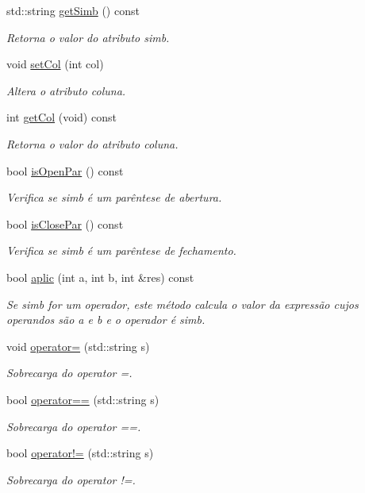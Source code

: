\begin{DoxyCompactItemize}
std\-::string \hyperlink{class_simbolo_ad2e86fd9678cc05b495938e27ef04b50}{get\-Simb} () const 
\begin{DoxyCompactList}\small\item\em Retorna o valor do atributo simb. \end{DoxyCompactList}\item 
void \hyperlink{class_simbolo_a9717bf2cea703db82e87c10a58655171}{set\-Col} (int col)
\begin{DoxyCompactList}\small\item\em Altera o atributo coluna. \end{DoxyCompactList}\item 
int \hyperlink{class_simbolo_a703e96438e392151f46cbdc8ac44c741}{get\-Col} (void) const 
\begin{DoxyCompactList}\small\item\em Retorna o valor do atributo coluna. \end{DoxyCompactList}\item 
bool \hyperlink{class_simbolo_a01b430f8460d586518d0c76cf2d07d5a}{is\-Open\-Par} () const 
\begin{DoxyCompactList}\small\item\em Verifica se simb é um parêntese de abertura. \end{DoxyCompactList}\item 
bool \hyperlink{class_simbolo_a9d76ad26a52668275249753e423c3b0f}{is\-Close\-Par} () const 
\begin{DoxyCompactList}\small\item\em Verifica se simb é um parêntese de fechamento. \end{DoxyCompactList}\item 
bool \hyperlink{class_simbolo_ad79485717cf10a7b91d88bb8601033e3}{aplic} (int a, int b, int \&res) const 
\begin{DoxyCompactList}\small\item\em Se simb for um operador, este método calcula o valor da expressão cujos operandos são a e b e o operador é simb. \end{DoxyCompactList}\item 
void \hyperlink{class_simbolo_a56163728117b5af530e4da38c3529860}{operator=} (std\-::string s)
\begin{DoxyCompactList}\small\item\em Sobrecarga do operator =. \end{DoxyCompactList}\item 
bool \hyperlink{class_simbolo_a7ff886b63ec4b31cd8351f545c4db897}{operator==} (std\-::string s)
\begin{DoxyCompactList}\small\item\em Sobrecarga do operator ==. \end{DoxyCompactList}\item 
bool \hyperlink{class_simbolo_aeedc387655f4f464149b6dafd83e7e88}{operator!=} (std\-::string s)
\begin{DoxyCompactList}\small\item\em Sobrecarga do operator !=. \end{DoxyCompactList}\end{DoxyCompactItemize}
